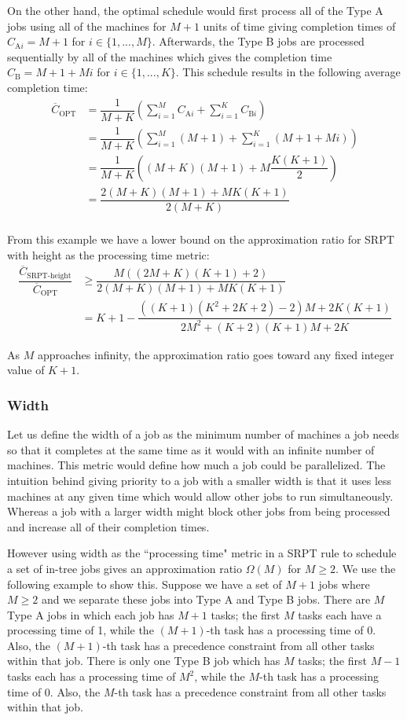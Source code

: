On the other hand, the optimal schedule would first process all of the Type A jobs using all of the machines for $M+1$ units of time giving completion times of $C_{\text{A}i}=M+1$ for $i\in\{1,...,M\}$.
Afterwards, the Type B jobs are processed sequentially by all of the machines which gives the completion time $C_\text{B}=M+1+Mi$ for $i\in\{1,...,K\}$.
This schedule results in the following average completion time:
\begin{align}
	\overline{C}_\text{OPT}  & = \dfrac{1}{M+K}\left(\sum_{i=1}^M C_{\text{A}i} + \sum_{i=1}^K C_{\text{B}i}\right) \nonumber \\
	& = \dfrac{1}{M+K}\left(\sum_{i=1}^M (M+1) + \sum_{i=1}^K (M+1+Mi)\right) \nonumber \\
	& = \dfrac{1}{M+K}\left((M+K)(M+1) + M\dfrac{K(K+1)}{2}\right) \nonumber \\
	& = \dfrac{2(M+K)(M+1) + MK(K+1)}{2(M+K)} \nonumber \\
\end{align}

From this example we have a lower bound on the approximation ratio for SRPT with height as the processing time metric:
\begin{align}
	\dfrac{\overline{C}_\text{SRPT-height}}{\overline{C}_\text{OPT}} & \geq \dfrac{M((2M+K)(K+1)+2)}{2(M+K)(M+1) + MK(K+1)} \nonumber \\
	& = K+1-\dfrac{((K+1)(K^2+2K+2)-2)M + 2K(K+1)}{2M^2 + (K+2)(K+1)M + 2K}
\end{align}

As $M$ approaches infinity, the approximation ratio goes toward any fixed integer value of $K+1$.

\subsubsection{Width}

Let us define the width of a job as the minimum number of machines a job needs so that it completes at the same time as it would with an infinite number of machines.
This metric would define how much a job could be parallelized.
The intuition behind giving priority to a job with a smaller width is that it uses less machines at any given time which would allow other jobs to run simultaneously.  Whereas a job with a larger width might block other jobs from being processed and increase all of their completion times.

However using width as the ``processing time" metric in a SRPT rule to schedule a set of in-tree jobs gives an approximation ratio $\Omega(M)$ for $M\geq 2$.
We use the following example to show this.
Suppose we have a set of $M+1$ jobs where $M\geq 2$ and we separate these jobs into Type A and Type B jobs.
There are $M$ Type A jobs in which each job has $M+1$ tasks; the first $M$ tasks each have a processing time of 1, while the $(M+1)$-th task has a processing time of 0.
Also, the $(M+1)$-th task has a precedence constraint from all other tasks within that job.
There is only one Type B job which has $M$ tasks; the first $M-1$ tasks each has a processing time of $M^2$, while the $M$-th task has a processing time of 0.
Also, the $M$-th task has a precedence constraint from all other tasks within that job.

